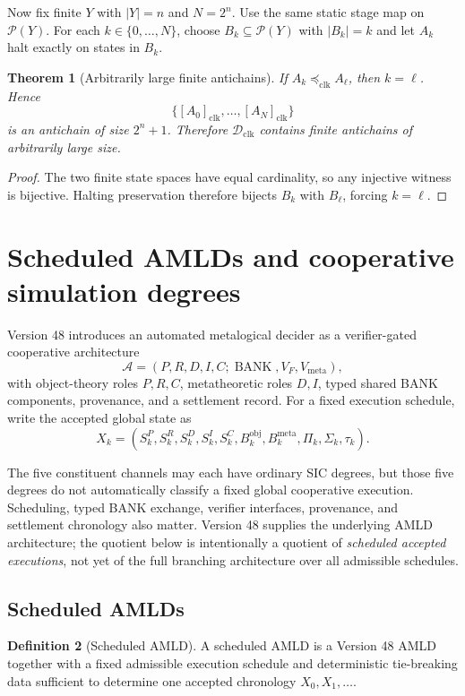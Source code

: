 \documentclass[11pt]{article}
\newtheorem{theorem}{Theorem}[section]
\theoremstyle{definition}
\newtheorem{definition}[theorem]{Definition}
\newcommand{\Pow}{\mathcal{P}}
\newcommand{\Dclk}{\mathcal{D}_{\mathrm{clk}}}
\newcommand{\preclk}{\preceq_{\mathrm{clk}}}
\begin{document}
Now fix finite $Y$ with $|Y|=n$ and $N=2^n$. Use the same static stage map on $\Pow(Y)$. For each $k\in\{0,\ldots,N\}$, choose $B_k\subseteq\Pow(Y)$ with $|B_k|=k$ and let $A_k$ halt exactly on states in $B_k$.

\begin{theorem}[Arbitrarily large finite antichains]
If $A_k\preclk A_\ell$, then $k=\ell$. Hence
\[
\{[A_0]_{\mathrm{clk}},\ldots,[A_N]_{\mathrm{clk}}\}
\]
is an antichain of size $2^n+1$. Therefore $\Dclk$ contains finite antichains of arbitrarily large size.
\end{theorem}

\begin{proof}
The two finite state spaces have equal cardinality, so any injective witness is bijective. Halting preservation therefore bijects $B_k$ with $B_\ell$, forcing $k=\ell$.
\end{proof}

\section{Scheduled AMLDs and cooperative simulation degrees}
Version 48 introduces an automated metalogical decider as a verifier-gated cooperative architecture~\cite{TennesonV48}
\[
\mathcal A=(P,R,D,I,C;\operatorname{BANK},V_F,V_{\mathrm{meta}}),
\]
with object-theory roles $P,R,C$, metatheoretic roles $D,I$, typed shared BANK components, provenance, and a settlement record. For a fixed execution schedule, write the accepted global state as
\[
X_k=(S_k^P,S_k^R,S_k^D,S_k^I,S_k^C,
B_k^{\mathrm{obj}},B_k^{\mathrm{meta}},\Pi_k,\Sigma_k,\tau_k).
\]

The five constituent channels may each have ordinary SIC degrees, but those five degrees do not automatically classify a fixed global cooperative execution. Scheduling, typed BANK exchange, verifier interfaces, provenance, and settlement chronology also matter. Version 48 supplies the underlying AMLD architecture; the quotient below is intentionally a quotient of \emph{scheduled accepted executions}, not yet of the full branching architecture over all admissible schedules.

\subsection{Scheduled AMLDs}
\begin{definition}[Scheduled AMLD]
A scheduled AMLD is a Version 48 AMLD together with a fixed admissible execution schedule and deterministic tie-breaking data sufficient to determine one accepted chronology $X_0,X_1,\ldots$.
\end{definition}
\end{document}
